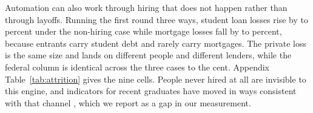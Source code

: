 Automation can also work through hiring that does not happen rather than through layoffs. Running
the first round three ways, student loan losses rise by  to
 percent under the non-hiring case while mortgage losses fall by
 to  percent, because entrants carry
student debt and rarely carry mortgages. The private loss is the same size and lands on different
people and different lenders, while the federal column is identical across the three cases to the
cent. Appendix Table~\ref{tab:attrition} gives the nine cells. People never hired at all are invisible to this engine, and indicators for recent graduates have
moved in ways consistent with that channel \citep{BrynjolfssonChandarChen2026}, which we report as
a gap in our measurement.
